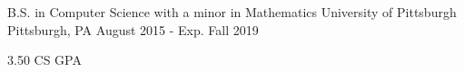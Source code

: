 
\vspace{-7mm}


\vspace{-1mm}
\begin{cventries}

  \cventry
    {B.S. in Computer Science with a minor in Mathematics} %
    {University of Pittsburgh} %
    {Pittsburgh, PA} %
    {August 2015 - Exp. Fall 2019} %
    {
      \begin{cvitems} %
        \item {3.50 CS GPA}
      \end{cvitems}
    }
    
  \vspace{-6mm}
  
\end{cventries}